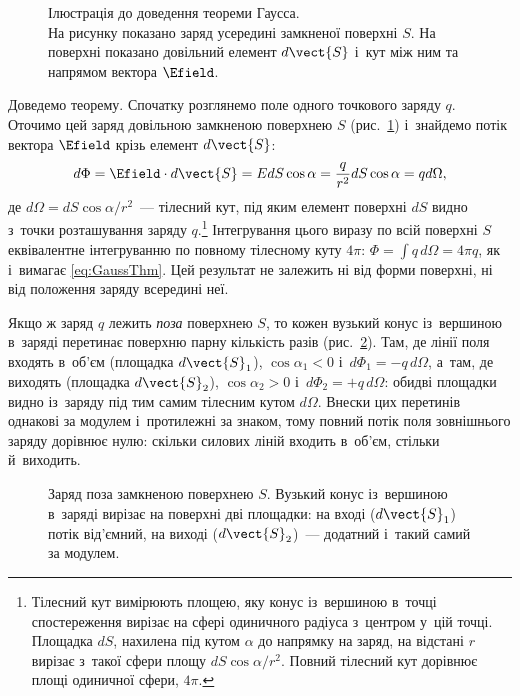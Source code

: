 \begin{figure}
	\centering
	\caption{Ілюстрація до доведення теореми Гаусса. \\ {\small На рисунку показано заряд
			усередині замкненої поверхні $S$. На поверхні показано довільний елемент $d\vect{S}$
			і~кут між ним та напрямом вектора $\Efield$.}}
	\label{tikz:Gauss_thm}
\end{figure}

Доведемо теорему. Спочатку розглянемо поле одного точкового заряду $q$. Оточимо цей заряд
довільною замкненою поверхнею $S$ (рис.~\ref{tikz:Gauss_thm}) і~знайдемо потік вектора
$\Efield$ крізь елемент $d\vect{S}$:
\begin{equation*}
	d\Phi = \Efield\cdot d\vect{S} = E dS\cos\alpha = \frac{q}{r^2} dS \cos\alpha = q d \Omega,
\end{equation*}
де $d \Omega = dS\cos\alpha/r^2$~--- тілесний кут, під яким елемент поверхні $dS$ видно
з~точки розташування заряду $q$.\footnote{Тілесний кут вимірюють площею, яку конус
	із~вершиною в~точці спостереження вирізає на сфері одиничного радіуса з~центром у~цій
	точці. Площадка $dS$, нахилена під кутом $\alpha$ до напрямку на заряд, на відстані $r$
	вирізає з~такої сфери площу $dS\cos\alpha/r^2$. Повний тілесний кут дорівнює площі
	одиничної сфери, $4\pi$.} Інтегрування цього виразу по всій поверхні $S$
еквівалентне інтегруванню по повному тілесному куту $4\pi$: $\Phi = \int q\, d\Omega =
	4\pi q$, як і~вимагає \eqref{eq:GaussThm}. Цей результат не залежить ні від форми
поверхні, ні від положення заряду всередині неї.

Якщо ж заряд $q$ лежить \emph{поза} поверхнею $S$, то кожен вузький конус із~вершиною
в~заряді перетинає поверхню парну кількість разів (рис.~\ref{tikz:Gauss_outside}). Там, де
лінії поля входять в~об'єм (площадка $d\vect{S}_1$), $\cos\alpha_1 < 0$ і~$d\Phi_1 =
-q\,d\Omega$, а~там, де виходять (площадка $d\vect{S}_2$), $\cos\alpha_2 > 0$ і~$d\Phi_2 =
+q\,d\Omega$: обидві площадки видно із~заряду під тим самим тілесним кутом $d\Omega$. Внески
цих перетинів однакові за модулем і~протилежні за знаком, тому повний потік поля
зовнішнього заряду дорівнює нулю: скільки силових ліній входить в~об'єм, стільки
й~виходить.

\begin{figure}
	\centering
	\caption{Заряд поза замкненою поверхнею $S$. Вузький конус із~вершиною в~заряді вирізає
		на поверхні дві площадки: на вході ($d\vect{S}_1$) потік від'ємний, на виході
		($d\vect{S}_2$)~--- додатний і~такий самий за модулем.}
	\label{tikz:Gauss_outside}
\end{figure}

